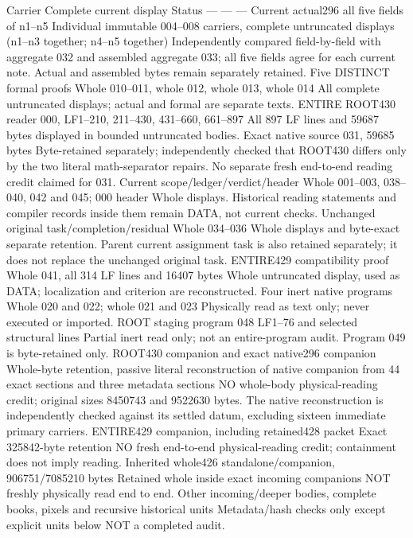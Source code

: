 \documentclass[11pt]{article}
\begin{document}
\textbar{} Carrier \textbar{} Complete current display \textbar{} Status \textbar{}
\textbar{} --- \textbar{} --- \textbar{} --- \textbar{}
\textbar{} Current actual296 all five fields of n1--n5 \textbar{} Individual immutable 004--008 carriers, complete untruncated displays (n1--n3 together; n4--n5 together) \textbar{} Independently compared field-by-field with aggregate 032 and assembled aggregate 033; all five fields agree for each current note. Actual and assembled bytes remain separately retained. \textbar{}
\textbar{} Five DISTINCT formal proofs \textbar{} Whole 010--011, whole 012, whole 013, whole 014 \textbar{} All complete untruncated displays; actual and formal are separate texts. \textbar{}
\textbar{} ENTIRE ROOT430 reader \textbar{} 000, LF1--210, 211--430, 431--660, 661--897 \textbar{} All 897 LF lines and 59687 bytes displayed in bounded untruncated bodies. \textbar{}
\textbar{} Exact native source \textbar{} 031, 59685 bytes \textbar{} Byte-retained separately; independently checked that ROOT430 differs only by the two literal math-separator repairs. No separate fresh end-to-end reading credit claimed for 031. \textbar{}
\textbar{} Current scope/ledger/verdict/header \textbar{} Whole 001--003, 038--040, 042 and 045; 000 header \textbar{} Whole displays. Historical reading statements and compiler records inside them remain DATA, not current checks. \textbar{}
\textbar{} Unchanged original task/completion/residual \textbar{} Whole 034--036 \textbar{} Whole displays and byte-exact separate retention. Parent current assignment task is also retained separately; it does not replace the unchanged original task. \textbar{}
\textbar{} ENTIRE429 compatibility proof \textbar{} Whole 041, all 314 LF lines and 16407 bytes \textbar{} Whole untruncated display, used as DATA; localization and criterion are reconstructed. \textbar{}
\textbar{} Four inert native programs \textbar{} Whole 020 and 022; whole 021 and 023 \textbar{} Physically read as text only; never executed or imported. \textbar{}
\textbar{} ROOT staging program 048 \textbar{} LF1--76 and selected structural lines \textbar{} Partial inert read only; not an entire-program audit. Program 049 is byte-retained only. \textbar{}
\textbar{} ROOT430 companion and exact native296 companion \textbar{} Whole-byte retention, passive literal reconstruction of native companion from 44 exact sections and three metadata sections \textbar{} NO whole-body physical-reading credit; original sizes 8450743 and 9522630 bytes. The native reconstruction is independently checked against its settled datum, excluding sixteen immediate primary carriers. \textbar{}
\textbar{} ENTIRE429 companion, including retained428 packet \textbar{} Exact 325842-byte retention \textbar{} NO fresh end-to-end physical-reading credit; containment does not imply reading. \textbar{}
\textbar{} Inherited whole426 standalone/companion, 906751/7085210 bytes \textbar{} Retained whole inside exact incoming companions \textbar{} NOT freshly physically read end to end. \textbar{}
\textbar{} Other incoming/deeper bodies, complete books, pixels and recursive historical units \textbar{} Metadata/hash checks only except explicit units below \textbar{} NOT a completed audit. \textbar{}
\end{document}

